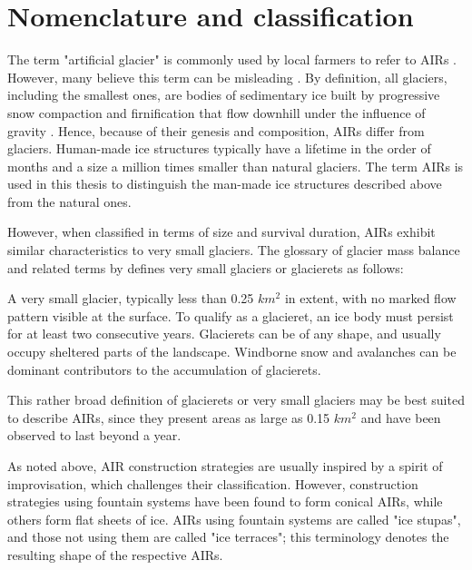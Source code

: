 \section{Nomenclature and classification}

The term "artificial glacier" is commonly used by local farmers to refer to \ac{AIRs}
\citep{norphelArtificialGlacierHigh2009}. However, many believe this term can be misleading
\citep{nusserSociohydrologyArtificialGlaciers2019}. By definition, all glaciers, including the smallest ones,
are bodies of sedimentary ice built by progressive snow compaction and firnification that flow
downhill under the influence of gravity \citep{benndouglasGlaciersGlaciation2014}. Hence, because of their
genesis and composition, \ac{AIRs} differ from glaciers. Human-made ice structures typically have a lifetime in
the order of months and a size a million times smaller than natural glaciers. The term \ac{AIRs} is used in this thesis to
distinguish the man-made ice structures described above from the natural ones.

However, when classified in terms of size and survival duration, \ac{AIRs} exhibit similar characteristics to
very small glaciers. The glossary of glacier mass balance and related terms by
\citet{cogleyGlossaryGlacierMass2010} defines very small glaciers or glacierets as follows:

\begin{thesis_quotation}
	A very small glacier, typically less than 0.25 $km^2$ in extent, with no marked flow pattern
	visible at the surface. To qualify as a glacieret, an ice body must persist for at least two consecutive
	years. Glacierets can be of any shape, and usually occupy sheltered parts of the landscape. Windborne snow and
	avalanches can be dominant contributors to the accumulation of glacierets.
\end{thesis_quotation}

This rather broad definition of glacierets or very small glaciers may be best suited to describe \ac{AIRs}, since
they present areas as large as 0.15 $km^2$ \citep{nusserSociohydrologyArtificialGlaciers2019} and
have been observed to last beyond a year.

As noted above, \ac{AIR} construction strategies are usually inspired by a spirit of improvisation, which challenges
their classification. However, construction strategies using fountain systems have been found to form
conical \ac{AIRs}, while others form flat sheets of ice. \ac{AIRs} using fountain systems are called
"ice stupas", and those not using them are called "ice terraces"; this terminology denotes the resulting shape of the
respective \ac{AIRs}.

